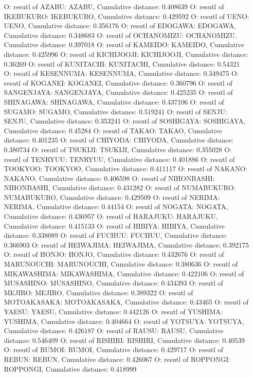 O: resutl of AZABU: AZABU, Cumulative distance: 0.408639
O: resutl of IKEBUKURO: IKEBUKURO, Cumulative distance: 0.429592
O: resutl of UENO: UENO, Cumulative distance: 0.356176
O: resutl of EDOGAWA: EDOGAWA, Cumulative distance: 0.348683
O: resutl of OCHANOMIZU: OCHANOMIZU, Cumulative distance: 0.397018
O: resutl of KAMEIDO: KAMEIDO, Cumulative distance: 0.425996
O: resutl of KICHIJOOJI: KICHIJOOJI, Cumulative distance: 0.36269
O: resutl of KUNITACHI: KUNITACHI, Cumulative distance: 0.54321
O: resutl of KESENNUMA: KESENNUMA, Cumulative distance: 0.349475
O: resutl of KOGANEI: KOGANEI, Cumulative distance: 0.360796
O: resutl of SANGENJAYA: SANGENJAYA, Cumulative distance: 0.425235
O: resutl of SHINAGAWA: SHINAGAWA, Cumulative distance: 0.437106
O: resutl of SUGAMO: SUGAMO, Cumulative distance: 0.519241
O: resutl of SENJU: SENJU, Cumulative distance: 0.353241
O: resutl of SOSHIGAYA: SOSHIGAYA, Cumulative distance: 0.45284
O: resutl of TAKAO: TAKAO, Cumulative distance: 0.401235
O: resutl of CHIYODA: CHIYODA, Cumulative distance: 0.380734
O: resutl of TSUKIJI: TSUKIJI, Cumulative distance: 0.355028
O: resutl of TENRYUU: TENRYUU, Cumulative distance: 0.401886
O: resutl of TOOKYOO: TOOKYOO, Cumulative distance: 0.411117
O: resutl of NAKANO: NAKANO, Cumulative distance: 0.406598
O: resutl of NIHONBASHI: NIHONBASHI, Cumulative distance: 0.431282
O: resutl of NUMABUKURO: NUMABUKURO, Cumulative distance: 0.429509
O: resutl of NERIMA: NERIMA, Cumulative distance: 0.44154
O: resutl of NOGATA: NOGATA, Cumulative distance: 0.436957
O: resutl of HARAJUKU: HARAJUKU, Cumulative distance: 0.415133
O: resutl of HIBIYA: HIBIYA, Cumulative distance: 0.338089
O: resutl of FUCHUU: FUCHUU, Cumulative distance: 0.366903
O: resutl of HEIWAJIMA: HEIWAJIMA, Cumulative distance: 0.392175
O: resutl of HONJO: HONJO, Cumulative distance: 0.432676
O: resutl of MARUNOUCHI: MARUNOUCHI, Cumulative distance: 0.380636
O: resutl of MIKAWASHIMA: MIKAWASHIMA, Cumulative distance: 0.422106
O: resutl of MUSASHINO: MUSASHINO, Cumulative distance: 0.434393
O: resutl of MEJIRO: MEJIRO, Cumulative distance: 0.389322
O: resutl of MOTOAKASAKA: MOTOAKASAKA, Cumulative distance: 0.43465
O: resutl of YAESU: YAESU, Cumulative distance: 0.442126
O: resutl of YUSHIMA: YUSHIMA, Cumulative distance: 0.404664
O: resutl of YOTSUYA: YOTSUYA, Cumulative distance: 0.426187
O: resutl of RAUSU: RAUSU, Cumulative distance: 0.546409
O: resutl of RISHIRI: RISHIRI, Cumulative distance: 0.40539
O: resutl of RUMOI: RUMOI, Cumulative distance: 0.429717
O: resutl of REBUN: REBUN, Cumulative distance: 0.426067
O: resutl of ROPPONGI: ROPPONGI, Cumulative distance: 0.418999
